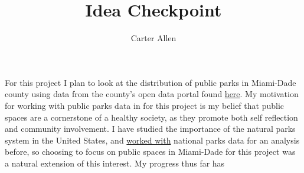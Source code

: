 \documentclass[12pt]{article}
\title{Idea Checkpoint}
\author{Carter Allen}
\begin{document}
\maketitle
\raggedright

For this project I plan to look at the distribution of public parks in Miami-Dade county using data from the county's open data portal found \href{https://opendata.miamidade.gov/Infrastructure/Parks-Facities/wjhr-nx6u}{here}. My motivation for working with public parks data in for this project is my belief that public spaces are a cornerstone of a healthy society, as they promote both self reflection and community involvement. I have studied the importance of the natural parks system in the United States, and \href{https://sufficientlyminimal.netlify.com/2018/01/28/congaree-big-trees/}{worked with} national parks data for an analysis before, so choosing to focus on public spaces in Miami-Dade for this project was a natural extension of this interest. My progress thus far has 
\end{document}
